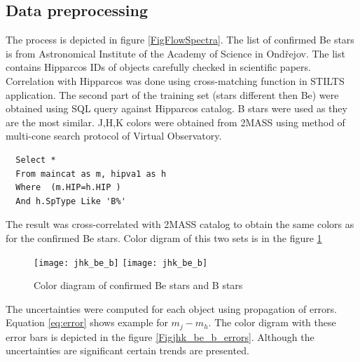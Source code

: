 \subsection{Data preprocessing}

The process is depicted in figure \ref{FigFlowSpectra}. The list of
confirmed Be stars is from Astronomical Institute of the Academy of
Science in Ond\v{r}ejov. The list contains Hipparcos IDs
\citep{perryman1997hipparcos} of objects carefully checked in
scientific papers. Correlation with Hipparcos was done using
cross-matching function in STILTS application. The second part of the
training set (stars different then Be) were obtained using SQL query
against Hipparcos catalog. B stars were used as they are the most
similar. J,H,K colors were obtained from 2MASS
\citep{skrutskie2006two} using method of multi-cone search protocol of
Virtual Observatory.



\begin{lstlisting}
  Select * 
  From maincat as m, hipva1 as h 
  Where  (m.HIP=h.HIP )  
  And h.SpType Like 'B%'
\end{lstlisting}

The result was cross-correlated with 2MASS catalog to obtain the same
colors as for the confirmed Be stars. Color digram of this two sets is
in the figure \ref{Figjhk_be_b}

    \begin{figure}[!htbp]
      \begin{center}
        \leavevmode
        \ifpdf
        \texttt{[image: jhk\_be\_b]}
        \else
        \texttt{[image: jhk\_be\_b]}
        \fi
        \caption{Color diagram of confirmed Be stars and B stars}
        \label{Figjhk_be_b}
      \end{center}
    \end{figure}

    The uncertainties were computed for each object using propagation
    of errors. Equation \ref{eq:error} shows example for $m_j - m_h$.
    The color digram with these error bars is depicted in the
    figure \ref{Figjhk_be_b_errors}. Although the uncertainties are
    significant certain trends are presented.

